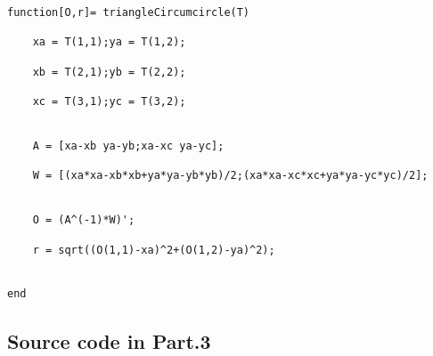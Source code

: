 \documentclass[a4paper, 12pt]{article}
\begin{document}
\begin{lstlisting}
function[O,r]= triangleCircumcircle(T)

	xa = T(1,1);ya = T(1,2);

	xb = T(2,1);yb = T(2,2);

	xc = T(3,1);yc = T(3,2);


	A = [xa-xb ya-yb;xa-xc ya-yc];

	W = [(xa*xa-xb*xb+ya*ya-yb*yb)/2;(xa*xa-xc*xc+ya*ya-yc*yc)/2];


	O = (A^(-1)*W)';

	r = sqrt((O(1,1)-xa)^2+(O(1,2)-ya)^2);


end
\end{lstlisting}

\subsection{Source code in Part.3}
%
\end{document}
